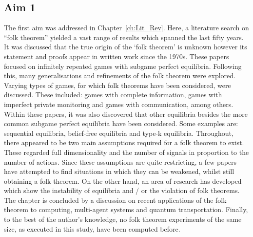 \subsection{Aim 1}\label{subsec:Aim_1_concl}
The first aim was addressed in Chapter~\ref{ch:Lit_Rev}. Here, a literature
search on ``folk theorem'' yielded a vast range of results which spanned the
last fifty years. It was discussed that the true origin of the `folk theorem' is
unknown however its statement and proofs appear in written work since the 1970s.
These papers focused on infinitely repeated games with subgame perfect
equilibria. Following this, many generalisations and refinements of the folk
theorem were explored. Varying types of games, for which folk theorems have been
considered, were discussed. These included: games with complete information,
games with imperfect private monitoring and games with communication, among
others. Within these papers, it was also discovered that other equilibria
besides the more common subgame perfect equilibria have been considered. Some
examples are: sequential equilibria, belief-free equilibria and type-k
equilibria. Throughout, there appeared to be two main assumptions required for a
folk theorem to exist. These regarded full dimensionality and the number of
signals in proportion to the number of actions. Since these assumptions are
quite restricting, a few papers have attempted to find situations in which they
can be weakened, whilst still obtaining a folk theorem. On the other hand, an
area of research has developed which show the instability of equilibria and / or
the violation of folk theorems. The chapter is concluded by a discussion on
recent applications of the folk theorem to computing, multi-agent systems and
quantum transportation. Finally, to the best of the author's knowledge, no folk
theorem experiments of the same size, as executed in this study, have been
computed before.

